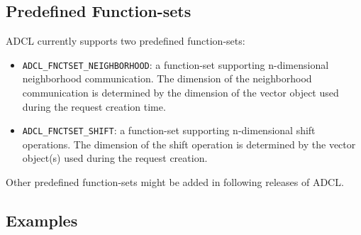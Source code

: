 \pagebreak
\subsection{Predefined Function-sets}
\label{fnctset-predef}

ADCL currently supports two predefined function-sets: 
\begin{itemize}
\item {\tt ADCL\_FNCTSET\_NEIGHBORHOOD}: a function-set supporting
  n-dimensional neighborhood communication. The dimension of the neighborhood
  communication is determined by the dimension of the vector object used
  during the request creation time.
\item {\tt ADCL\_FNCTSET\_SHIFT}: a function-set supporting n-dimensional
  shift operations. The dimension of the shift operation is determined by the
  vector object(s) used during the request creation.
\end{itemize}

Other predefined function-sets might be added in following releases of ADCL.

\subsection{Examples}

